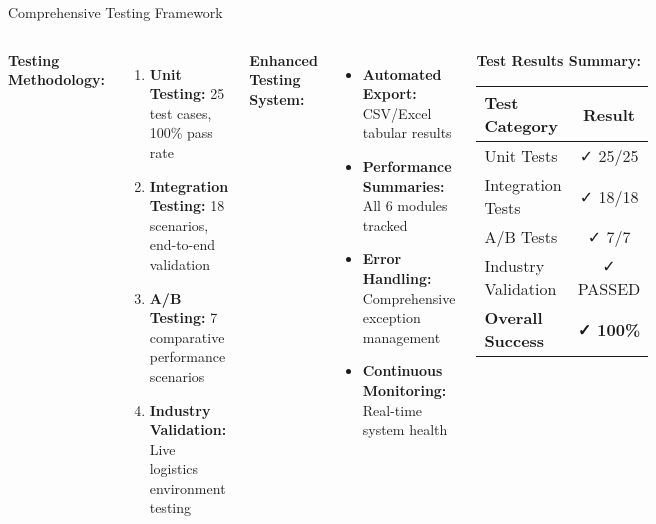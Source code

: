 \documentclass[aspectratio=169]{beamer}
\begin{document}
\begin{frame}{Comprehensive Testing Framework}
\begin{columns}
\textbf{Testing Methodology:}
\begin{enumerate}
\item \textbf{Unit Testing:} 25 test cases, 100\% pass rate
\item \textbf{Integration Testing:} 18 scenarios, end-to-end validation
\item \textbf{A/B Testing:} 7 comparative performance scenarios
\item \textbf{Industry Validation:} Live logistics environment testing
\end{enumerate}

\vspace{0.3cm}
\textbf{Enhanced Testing System:}
\begin{itemize}
\item \textbf{Automated Export:} CSV/Excel tabular results
\item \textbf{Performance Summaries:} All 6 modules tracked
\item \textbf{Error Handling:} Comprehensive exception management
\item \textbf{Continuous Monitoring:} Real-time system health
\end{itemize}

\begin{center}
\textbf{Test Results Summary:}\\
\vspace{0.3cm}
\small
\begin{tabular}{|l|c|}
\hline
\textbf{Test Category} & \textbf{Result} \\
\hline
Unit Tests & \textcolor{successgreen}{✓ 25/25} \\
Integration Tests & \textcolor{successgreen}{✓ 18/18} \\
A/B Tests & \textcolor{successgreen}{✓ 7/7} \\
Industry Validation & \textcolor{successgreen}{✓ PASSED} \\
\hline
\textbf{Overall Success} & \textcolor{successgreen}{\textbf{✓ 100\%}} \\
\hline
\end{tabular}
\end{center}
\end{columns}
\end{frame}
\end{document}
